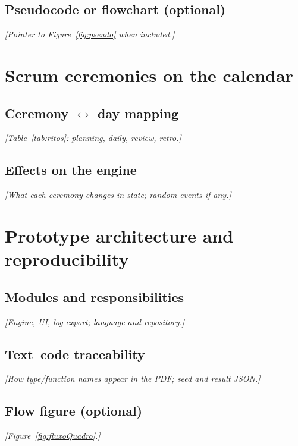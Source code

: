 \subsection{Pseudocode or flowchart (optional)}
\textit{[Pointer to Figure~\ref{fig:pseudo} when included.]}

\section{Scrum ceremonies on the calendar}
\label{sec:ritos}

\subsection{Ceremony $\leftrightarrow$ day mapping}
\textit{[Table~\ref{tab:ritos}: planning, daily, review, retro.]}

\subsection{Effects on the engine}
\textit{[What each ceremony changes in state; random events if any.]}

\section{Prototype architecture and reproducibility}
\label{sec:arquitetura}

\subsection{Modules and responsibilities}
\textit{[Engine, UI, log export; language and repository.]}

\subsection{Text--code traceability}
\textit{[How type/function names appear in the PDF; seed and result JSON.]}

\subsection{Flow figure (optional)}
\textit{[Figure~\ref{fig:fluxoQuadro}.]}

